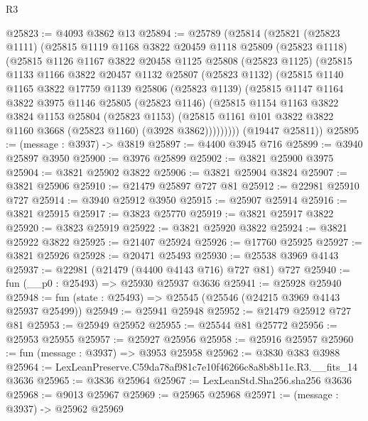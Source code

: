 \begin{lexlean}{R3}
\begin{coremodule}
@25823 := @4093 @3862 @13
@25894 := @25789
    (@25814
      (@25821
        (@25823 @1111)
        (@25815
          @1119
          @1168
          @3822
          @20459
          @1118
          @25809
          (@25823 @1118)
          (@25815
            @1126
            @1167
            @3822
            @20458
            @1125
            @25808
            (@25823 @1125)
            (@25815
              @1133
              @1166
              @3822
              @20457
              @1132
              @25807
              (@25823 @1132)
              (@25815
                @1140
                @1165
                @3822
                @17759
                @1139
                @25806
                (@25823 @1139)
                (@25815
                  @1147
                  @1164
                  @3822
                  @3975
                  @1146
                  @25805
                  (@25823 @1146)
                  (@25815
                    @1154
                    @1163
                    @3822
                    @3824
                    @1153
                    @25804
                    (@25823 @1153)
                    (@25815 @1161 @101 @3822 @3822 @1160 @3668 (@25823 @1160) (@3928 @3862)))))))))
      (@19447 @25811))
@25895 := (message : @3937) -> @3819
@25897 := @4400 @3945 @716
@25899 := @3940 @25897 @3950
@25900 := @3976 @25899
@25902 := @3821 @25900 @3975
@25904 := @3821 @25902 @3822
@25906 := @3821 @25904 @3824
@25907 := @3821 @25906
@25910 := @21479 @25897 @727 @81
@25912 := @22981 @25910 @727
@25914 := @3940 @25912 @3950
@25915 := @25907 @25914
@25916 := @3821 @25915
@25917 := @3823 @25770
@25919 := @3821 @25917 @3822
@25920 := @3823 @25919
@25922 := @3821 @25920 @3822
@25924 := @3821 @25922 @3822
@25925 := @21407 @25924
@25926 := @17760 @25925
@25927 := @3821 @25926
@25928 := @20471 @25493
@25930 := @25538 @3969 @4143
@25937 := @22981 (@21479 (@4400 @4143 @716) @727 @81) @727
@25940 := fun (__p0 : @25493) => @25930 @25937 @3636
@25941 := @25928 @25940
@25948 := fun (state : @25493) => @25545 (@25546 (@24215 @3969 @4143 @25937 @25499))
@25949 := @25941 @25948
@25952 := @21479 @25912 @727 @81
@25953 := @25949 @25952
@25955 := @25544 @81 @25772
@25956 := @25953 @25955
@25957 := @25927 @25956
@25958 := @25916 @25957
@25960 := fun (message : @3937) => @3953 @25958
@25962 := @3830 @383 @3988
@25964 := LexLeanPreserve.C59da78af981c7e10f46266c8a8b8b11e.R3.__fits_14 @3636
@25965 := @3836 @25964
@25967 := LexLeanStd.Sha256.sha256 @3636
@25968 := @9013 @25967
@25969 := @25965 @25968
@25971 := (message : @3937) -> @25962 @25969

\end{coremodule}
\end{lexlean}
